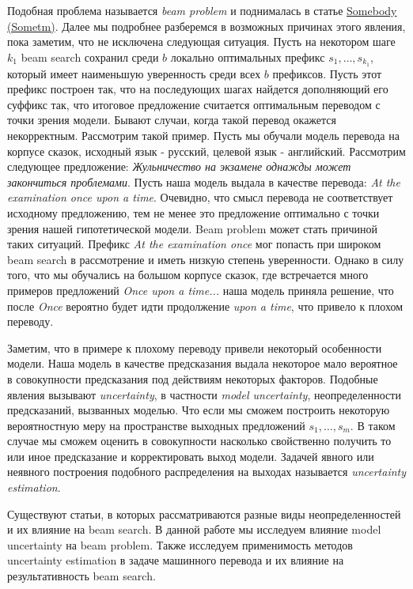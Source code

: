 \documentclass[a4paper,12pt]{article} %
\newcommand{\bibref}[3]{\hyperlink{#1}{#2 (#3)}} %
\begin{document}
	
	Подобная проблема называется \textit{beam problem} и поднималась в статье \bibref{beam_prob1}{Somebody}{Sometm}. Далее мы подробнее разберемся в возможных причинах этого явления, пока заметим, что не исключена следующая ситуация. Пусть на некотором шаге $k_1$ beam search сохранил среди $b$ локально оптимальных префикс $s_1, \dots, s_{k_1}$, который имеет наименьшую уверенность среди всех $b$ префиксов. Пусть этот префикс построен так, что на последующих шагах найдется дополняющий его суффикс так, что итоговое предложение считается оптимальным переводом с точки зрения модели. Бывают случаи, когда такой перевод окажется некорректным. Рассмотрим такой пример. Пусть мы обучали модель перевода на корпусе сказок, исходный язык - русский, целевой язык - английский. Рассмотрим следующее предложение: \textit{Жульничество на экзамене однажды может закончиться проблемами}. Пусть наша модель выдала в качестве перевода: \textit{At the examination once upon a time}. Очевидно, что смысл перевода не соответствует исходному предложению, тем не менее это предложение оптимально с точки зрения нашей гипотетической модели. Beam problem может стать причиной таких ситуаций. Префикс \textit{At the examination once} мог попасть при широком beam search в рассмотрение и иметь низкую степень уверенности. Однако в силу того, что мы обучались на большом корпусе сказок, где встречается много примеров предложений \textit{Once upon a time...} наша модель приняла решение, что после \textit{Once} вероятно будет идти продолжение \textit{upon a time}, что привело к плохом переводу.
	
	Заметим, что в примере к плохому переводу привели некоторый особенности модели. Наша модель в качестве предсказания выдала некоторое мало вероятное в совокупности предсказания под действиям некоторых факторов. Подобные явления вызывают \textit{uncertainty}, в частности \textit{model uncertainty}, неопределенности предсказаний, вызванных моделью. Что если мы сможем построить некоторую вероятностную меру на пространстве выходных предложений $s_1, \dots, s_m$. В таком случае мы сможем оценить в совокупности насколько свойственно получить то или иное предсказание и корректировать выход модели. Задачей явного или неявного построения подобного распределения на выходах называется \textit{uncertainty estimation}. 
	
	Существуют статьи, в которых рассматриваются разные виды неопределенностей и их влияние на beam search. В данной работе мы исследуем влияние model uncertainty на beam problem. Также исследуем применимость методов uncertainty estimation в задаче машинного перевода и их влияние на результативность beam search.
	
\end{document}
